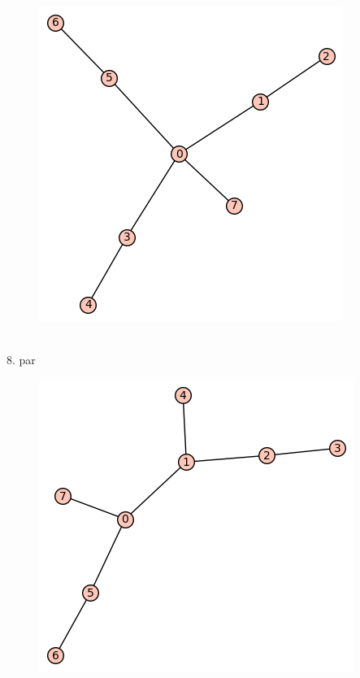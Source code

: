 \documentclass[12pt, a4paper]{article}
\begin{document}
\begin{figure}[h!]
\centering
\includegraphics[width=\linewidth]{t-44}
\end{figure} \\

8. par

\begin{figure}[h!]
\centering
\includegraphics[width=\linewidth]{t-30}
\end{figure} \\
\end{document}
